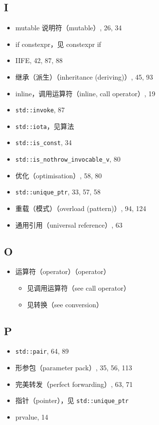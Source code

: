 \subsection{I}

\begin{itemize}
\item mutable 说明符（mutable）, 26, 34
\item if constexpr，见 constexpr if
\item IIFE, 42, 87, 88
\item 继承（派生）（inheritance (deriving)）, 45, 93
\item inline，调用运算符（inline, call operator）, 19
\item \texttt{std::invoke}, 87
\item \texttt{std::iota}，见算法
\item \texttt{std::is\_const}, 34
\item \texttt{std::is\_nothrow\_invocable\_v}, 80
\item 优化（optimisation）, 58, 80
\item \texttt{std::unique\_ptr}, 33, 57, 58
\item 重载（模式）（overload (pattern)）, 94, 124
\item 通用引用（universal reference）, 63
\end{itemize}

\subsection{O}

\begin{itemize}
\item 运算符（operator）（operator）
  \begin{itemize}
  \item 见调用运算符（see call operator）
  \item 见转换（see conversion）
  \end{itemize}
\end{itemize}

\subsection{P}

\begin{itemize}
\item \texttt{std::pair}, 64, 89
\item 形参包（parameter pack）, 35, 56, 113
\item 完美转发（perfect forwarding）, 63, 71
\item 指针（pointer），见 \texttt{std::unique\_ptr}
\item prvalue, 14
\end{itemize}

